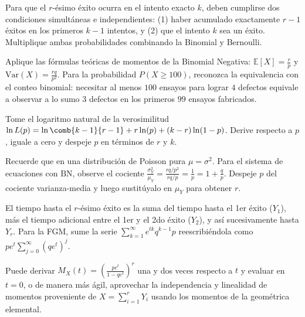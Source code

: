 \begin{sugerencia}
	\label{sug:3.5.3}
	Para que el $r$-ésimo éxito ocurra en el intento exacto $k$, deben cumplirse dos condiciones simultáneas e independientes: (1) haber acumulado exactamente $r-1$ éxitos en los primeros $k-1$ intentos, y (2) que el intento $k$ sea un éxito. Multiplique ambas probabilidades combinando la Binomial y Bernoulli.
\end{sugerencia}

\begin{sugerencia}
	\label{sug:3.5.4}
	Aplique las fórmulas teóricas de momentos de la Binomial Negativa: $\mathbb{E}[X] = \frac{r}{p}$ y $\text{Var}(X) = \frac{rq}{p^2}$. Para la probabilidad $P(X \ge 100)$, reconozca la equivalencia con el conteo binomial: necesitar al menos $100$ ensayos para lograr $4$ defectos equivale a observar a lo sumo $3$ defectos en los primeros $99$ ensayos fabricados.
\end{sugerencia}

\begin{sugerencia}
	\label{sug:3.5.5}
	Tome el logaritmo natural de la verosimilitud $\ln L(p) = \ln \comb{k-1}{r-1} + r \ln(p) + (k-r)\ln(1-p)$. Derive respecto a $p$, iguale a cero y despeje $p$ en términos de $r$ y $k$.
\end{sugerencia}

\begin{sugerencia}
	\label{sug:3.5.6}
	Recuerde que en una distribución de Poisson pura $\mu = \sigma^2$. Para el sistema de ecuaciones con $\text{BN}$, observe el cociente $\frac{\sigma_Y^2}{\mu_Y} = \frac{rq/p^2}{rq/p} = \frac{1}{p} = 1 + \frac{q}{p}$. Despeje $p$ del cociente varianza-media y luego sustitúyalo en $\mu_Y$ para obtener $r$.
\end{sugerencia}

\begin{sugerencia}
	\label{sug:3.5.7}
	El tiempo hasta el $r$-ésimo éxito es la suma del tiempo hasta el 1er éxito ($Y_1$), más el tiempo adicional entre el 1er y el 2do éxito ($Y_2$), y así sucesivamente hasta $Y_r$. Para la FGM, sume la serie $\sum_{k=1}^{\infty} e^{tk} q^{k-1} p$ reescribiéndola como $p e^t \sum_{j=0}^{\infty} (q e^t)^j$.
\end{sugerencia}

\begin{sugerencia}
	\label{sug:3.5.8}
	Puede derivar $M_X(t) = \left(\frac{p e^t}{1-qe^t}\right)^r$ una y dos veces respecto a $t$ y evaluar en $t=0$, o de manera más ágil, aprovechar la independencia y linealidad de momentos proveniente de $X = \sum_{i=1}^r Y_i$ usando los momentos de la geométrica elemental.
\end{sugerencia}

